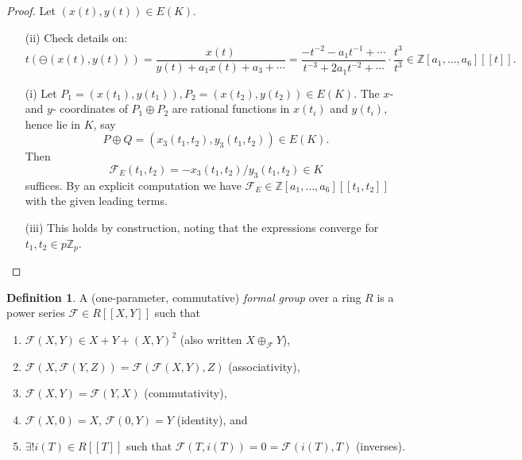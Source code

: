 \documentclass[a4paper]{article}
\theoremstyle{definition}
\newtheorem*{definition}{Definition}
\newcommand{\series}[2]{#1[\![#2]\!]}
\newcommand{\calF}{\mathcal{F}}
\newcommand{\Z}{\mathbb{Z}}
\begin{document}
\begin{proof}
    Let $(x(t),y(t))\in E(K)$.
    \begin{enumerate}
        \item[(ii)] Check details on:
            \begin{equation*}
                t(\ominus(x(t),y(t)))
                    = \frac{x(t)}{y(t)+a_1x(t)+a_3+\cdots}
                    = \frac{-t^{-2}-a_1t^{-1}+\cdots}{t^{-3}+2a_1t^{-2}+\cdots}
                        \cdot\frac{t^3}{t^3}
                    \in\series{\Z[a_1,\ldots,a_6]}{t}.
        \end{equation*}

        \item[(i)] Let $P_1=(x(t_1),y(t_1)),P_2=(x(t_2),y(t_2))\in E(K)$. The $x$-
            and $y$- coordinates of $P_1\oplus P_2$ are rational functions in
            $x(t_i)$ and $y(t_i)$, hence lie in $K$, say
            \begin{equation*}
                P\oplus Q = (x_3(t_1,t_2),y_3(t_1,t_2)) \in E(K).
            \end{equation*}
            Then
            \begin{equation*}
                \calF_E(t_1,t_2) = -x_3(t_1,t_2)/y_3(t_1,t_2) \in K
            \end{equation*}
            suffices. By an explicit computation we have
            $\calF_E\in\series{\Z[a_1,\ldots,a_6]}{t_1,t_2}$ with the given
            leading terms.

        \item[(iii)] This holds by construction, noting that the expressions
            converge for $t_1,t_2\in p\Z_p$.
    \end{enumerate}
\end{proof}

\begin{definition}
    A (one-parameter, commutative) \emph{formal group} over a ring $R$ is a
    power series $\calF\in\series{R}{X,Y}$ such that
    \begin{enumerate}[label=(\roman*)]
        \item $\calF(X,Y)\in X+Y+(X,Y)^2$ (also written $X\oplus_\calF Y$),
        \item $\calF(X,\calF(Y,Z))=\calF(\calF(X,Y),Z)$ (associativity),
        \item $\calF(X,Y)=\calF(Y,X)$ (commutativity),
        \item $\calF(X,0)=X$, $\calF(0,Y)=Y$ (identity), and
        \item $\exists!i(T)\in\series{R}{T}$ such that
            $\calF(T,i(T))=0=\calF(i(T),T)$ (inverses).
    \end{enumerate}
\end{definition}
\end{document}
